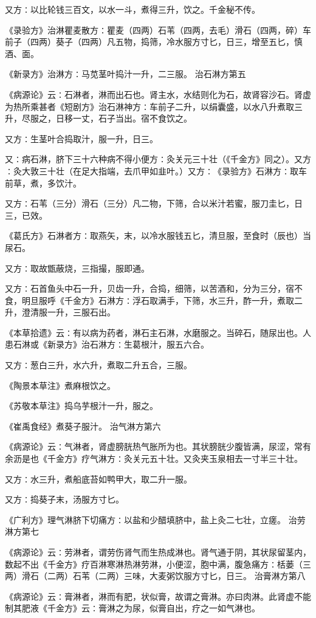 \documentclass[a4paper,12pt,UTF8,twoside]{ctexbook}
\begin{document}
又方∶以比轮钱三百文，以水一斗，煮得三升，饮之。千金秘不传。

《录验方》治淋瞿麦散方∶瞿麦（四两）石苇（四两，去毛）滑石（四两，碎）车前子（四两）葵子（四两）凡五物，捣筛，冷水服方寸匕，日三，增至五匕，慎酒、面。

《新录方》治淋方∶马苋茎叶捣汁一升，二三服。
治石淋方第五

《病源论》云∶石淋者，淋而出石也。肾主水，水结则化为石，故肾容沙石。肾虚为热所乘甚者《短剧方》治石淋神方∶车前子二升，以绢囊盛，以水八升煮取三升，尽服之，日移一丈，石子当出。宿不食饮之。

又方∶生茎叶合捣取汁，服一升，日三。

又∶病石淋，脐下三十六种病不得小便方∶灸关元三十壮（《千金方》同之）。又方∶灸大敦三十壮（在足大指端，去爪甲如韭叶。）又方∶《录验方》石淋方∶取车前草，煮，多饮汁。

又方∶石苇（三分）滑石（三分）凡二物，下筛，合以米汁若蜜，服刀圭匕，日三，已效。

《葛氏方》石淋者方∶取燕矢，末，以冷水服钱五匕，清旦服，至食时（辰也）当尿石。

又方∶取故甑蔽烧，三指撮，服即通。

又方∶石首鱼头中石一升，贝齿一升，合捣，细筛，以苦酒和，分为三分，宿不食，明旦服呼《千金方》石淋方∶浮石取满手，下筛，水三升，酢一升，煮取二升，澄清服一升，三服石出。

《本草拾遗》云∶有以病为药者，淋石主石淋，水磨服之。当碎石，随尿出也。人患石淋或《新录方》治石淋方∶生葛根汁，服五六合。

又方∶葱白三升，水六升，煮取二升五合，三服。

《陶景本草注》煮麻根饮之。

《苏敬本草注》捣乌芋根汁一升，服之。

《崔禹食经》煮葵子服汁。
治气淋方第六

《病源论》云∶气淋者，肾虚膀胱热气胀所为也。其状膀胱少腹皆满，尿涩，常有余沥是也《千金方》疗气淋方∶灸关元五十壮。又灸夹玉泉相去一寸半三十壮。

又方∶水三升，煮船底苔如鸭甲大，取二升一服。

又方∶捣葵子末，汤服方寸匕。

《广利方》理气淋脐下切痛方∶以盐和少醋填脐中，盐上灸二七壮，立瘥。
治劳淋方第七

《病源论》云∶劳淋者，谓劳伤肾气而生热成淋也。肾气通于阴，其状尿留茎内，数起不出《千金方》疗百淋寒淋热淋劳淋，小便涩，胞中满，腹急痛方∶栝蒌（三两）滑石（二两）石苇（二两）三味，大麦粥饮服方寸匕，日三。
治膏淋方第八

《病源论》云∶膏淋者，淋而有肥，状似膏，故谓之膏淋。亦曰肉淋。此肾虚不能制其肥液《千金方》云∶膏淋之为尿，似膏自出，疗之一如气淋也。
\end{document}
